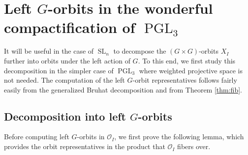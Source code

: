 \documentclass{amsart}
\newcommand{\C}{\mathbb{C}}
\newcommand{\fr}{\mathfrak}
\newcommand{\Proj}{\mathbb{P}}
\DeclareMathOperator{\End}{End}
\DeclareMathOperator{\SL}{SL}
\DeclareMathOperator{\PGL}{PGL}
\theoremstyle{definition}
\theoremstyle{remark}
\numberwithin{equation}{section}
\begin{document}



\section{Left $G$-orbits in the wonderful compactification of $\PGL_3$}

It will be useful in the case of $\SL_n$ to decompose the $(G\times G)$-orbits $X_I$ further into orbits under the left action of $G$.
To this end, we first study this decomposition in the simpler case of $\PGL_3$ where weighted projective space is not needed.
The computation of the left $G$-orbit representatives follows fairly easily from the generalized Bruhat decomposition and from Theorem \ref{thm:fib}.



\subsection{Decomposition into left $G$-orbits}

Before computing left $G$-orbits in $\mathcal{O}_I$, we first prove the following lemma, which provides the orbit representatives in the product that $\mathcal{O}_I$ fibers over.
\end{document}
